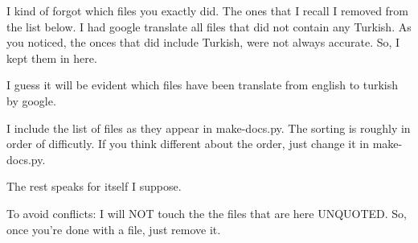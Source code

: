 \documentclass[12pt]{article}
\newcommand{\nvf}[1]{{\leavevmode\color{red}#1}\marginnote{\dbend}}
\begin{document}
\nvf{I kind of forgot which files you exactly did. The ones that I recall I removed from the list below. I had google translate all files that did not contain any Turkish. As you noticed, the onces that did include Turkish, were not always accurate. So, I kept them in here. 

I guess it will be evident which files have been translate from english to turkish by google. 

I include the list of files as they appear in make-docs.py. The sorting is roughly in order of difficutly. If you think different about the order, just change it in make-docs.py.

The rest speaks for itself I suppose.

To avoid conflicts: I will NOT touch the the files that are here UNQUOTED. So, once you're done with a file, just remove it. 

}
\end{document}
